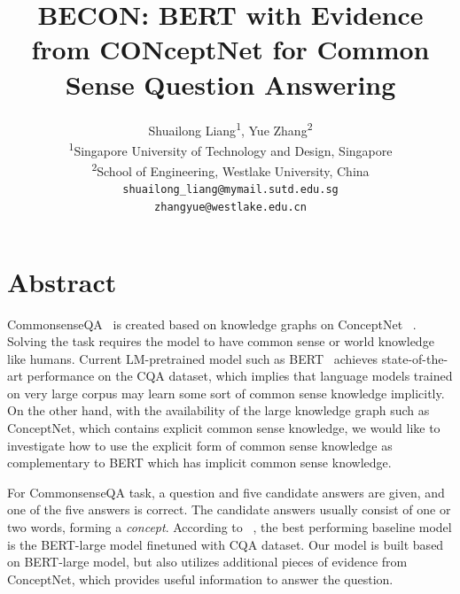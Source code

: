 \documentclass[11pt,a4paper]{article}
\title{BECON: \textbf{B}ERT with \textbf{E}vidence from \textbf{CON}ceptNet for Common Sense Question Answering}
\author{Shuailong Liang\textsuperscript{1}, Yue Zhang\textsuperscript{2}\\
    \textsuperscript{1}Singapore University of Technology and Design, Singapore\\
    \textsuperscript{2}School of Engineering, Westlake University, China\\
    {\tt shuailong\_liang@mymail.sutd.edu.sg}\\
    {\tt zhangyue@westlake.edu.cn}
}
\date{}
\begin{document}
\maketitle
\section*{Abstract}

CommonsenseQA~\cite{talmor2018commonsenseqa} is created based on knowledge graphs on ConceptNet ~\cite{speer2017conceptnet}. Solving the task requires the model to have common sense or world knowledge like humans. Current LM-pretrained model such as BERT~\cite{devlin2018bert} achieves state-of-the-art performance on the CQA dataset, which implies that language models trained on very large corpus may learn some sort of common sense knowledge implicitly. On the other hand, with the availability of the large knowledge graph such as ConceptNet, which contains explicit common sense knowledge, we would like to investigate how to use the explicit form of common sense knowledge as complementary to BERT which has implicit common sense knowledge.

For CommonsenseQA task, a question and five candidate answers are given, and one of the five answers is correct. The candidate answers usually consist of one or two words, forming a \textit{concept}. According to ~\cite{talmor2018commonsenseqa}, the best performing baseline model is the BERT-large model finetuned with CQA dataset. Our model is built based on BERT-large model, but also utilizes additional pieces of evidence from ConceptNet, which provides useful information to answer the question.
\end{document}
